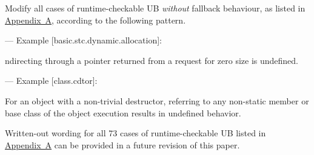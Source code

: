 Modify all cases of runtime-checkable UB \emph{without} fallback behaviour, as listed in \hyperref[appendix]{Appendix~A}, according to the following pattern. 

--- Example [basic.stc.dynamic.allocation]:

\begin{adjustwidth}{0.5cm}{0.5cm}
ndirecting through a pointer  returned from a request for zero size is undefined.
\end{adjustwidth}

--- Example [class.cdtor]:

\begin{adjustwidth}{0.5cm}{0.5cm}
For an object with a non-trivial destructor, referring to any non-static member or base class of the object  execution results in undefined behavior.
\end{adjustwidth}

Written-out wording for all 73 cases of runtime-checkable UB listed in \hyperref[appendix]{Appendix~A} can be provided in a future revision of this paper.


